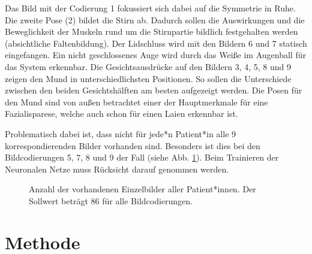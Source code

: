 Das Bild mit der Codierung 1 fokussiert sich dabei auf die Symmetrie in Ruhe. Die zweite Pose (2) bildet die Stirn ab. Dadurch sollen die Auswirkungen und die Beweglichkeit der Muskeln rund um die Stirnpartie bildlich festgehalten werden (absichtliche Faltenbildung). Der Lidschluss wird mit den Bildern 6 und 7 statisch eingefangen. Ein nicht geschlossenes Auge wird durch das Weiße im Augenball für das System erkennbar. Die Gesichtsausdrücke auf den Bildern 3, 4, 5, 8 und 9 zeigen den Mund in unterschiedlichsten Positionen. So sollen die Unterschiede zwischen den beiden Gesichtshälften am besten aufgezeigt werden. Die Posen für den Mund sind von außen betrachtet einer der Hauptmerkmale für eine Fazialisparese, welche auch schon für einen Laien erkennbar ist.

Problematisch dabei ist, dass nicht für jede*n Patient*in alle 9 korrespondierenden Bilder vorhanden sind. Besonders ist dies bei den Bildcodierungen 5, 7, 8 und 9 der Fall (siehe Abb. \ref{cap:bar_code}). Beim Trainieren der Neuronalen Netze muss Rücksicht darauf genommen werden.


\begin{figure}[!tb]\centering
{}
\caption[Anzahl der vorhandenen  Einzelbilder aller Patient*innen]{Anzahl der vorhandenen  Einzelbilder aller Patient*innen. Der Sollwert beträgt 86 für alle Bildcodierungen.}\label{cap:bar_code}
\end{figure}\label{fig:bar_code}





\clearpage
\section{Methode}\label{method}
